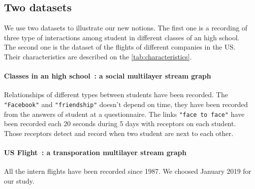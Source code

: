 \documentclass{svproc}
\begin{document}
\subsection{Two datasets}
%
We use two datasets to illustrate our new notions. The first one is a recording of three type of interactions among student in different classes of an high school. The second one is the dataset of the flights of different companies in the US. Their characteristics are described on the \cref{tab:characteristics}.
\paragraph{Classes in an high school~\cite{cpge}: a social multilayer stream graph} Relationships of different types between students have been recorded.  The \texttt{"Facebook"} and \texttt{"friendship"} doesn't depend on time, they have been recorded from the answers of student at a questionnaire. The links \texttt{"face to face"} have been recorded each 20 seconds during 5 days with receptors on each student. Those receptors detect and record when two student are next to each other.
%



\paragraph{US Flight~\cite{planes}: a transporation multilayer stream graph} All the intern flights have been recorded since 1987. We choosed January 2019 for our study. 
\end{document}
